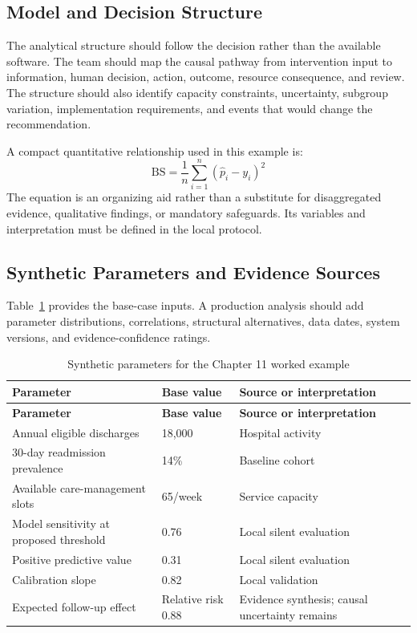 \subsection{Model and Decision Structure}
The analytical structure should follow the decision rather than the available
software. The team should map the causal pathway from intervention input to
information, human decision, action, outcome, resource consequence, and review.
The structure should also identify capacity constraints, uncertainty, subgroup
variation, implementation requirements, and events that would change the
recommendation.

A compact quantitative relationship used in this example is:
\begin{equation}
\mathrm{BS}=\frac{1}{n}\sum_{i=1}^{n}(\hat p_i-y_i)^2
\label{eq:comp-ch11-key-relationship}
\end{equation}
The equation is an organizing aid rather than a substitute for disaggregated evidence,
qualitative findings, or mandatory safeguards. Its variables and interpretation must
be defined in the local protocol.

\subsection{Synthetic Parameters and Evidence Sources}
Table~\ref{tab:comp-ch11-parameters} provides the base-case inputs. A
production analysis should add parameter distributions, correlations, structural
alternatives, data dates, system versions, and evidence-confidence ratings.

\begin{longtable}{@{}p{}p{}p{}@{}}
\caption{Synthetic parameters for the Chapter 11 worked example}
\label{tab:comp-ch11-parameters}\\
\toprule
\textbf{Parameter} & \textbf{Base value} & \textbf{Source or interpretation} \\
\midrule
\endfirsthead
\toprule
\textbf{Parameter} & \textbf{Base value} & \textbf{Source or interpretation} \\
\midrule
\endhead
\bottomrule
\endlastfoot
Annual eligible discharges & 18,000 & Hospital activity \\
30-day readmission prevalence & 14\% & Baseline cohort \\
Available care-management slots & 65/week & Service capacity \\
Model sensitivity at proposed threshold & 0.76 & Local silent evaluation \\
Positive predictive value & 0.31 & Local silent evaluation \\
Calibration slope & 0.82 & Local validation \\
Expected follow-up effect & Relative risk 0.88 & Evidence synthesis; causal uncertainty remains \\
\end{longtable}

